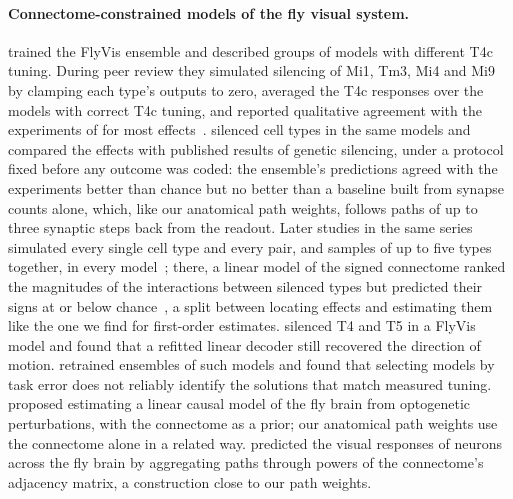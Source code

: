 \paragraph{Connectome-constrained models of the fly visual system.}
\citet{lappalainen2024connectome} trained the FlyVis ensemble and described groups of models with different T4c tuning. During peer review they simulated silencing of Mi1, Tm3, Mi4 and Mi9 by clamping each type's outputs to zero, averaged the T4c responses over the models with correct T4c tuning, and reported qualitative agreement with the experiments of \citet{strother2017emergence} for most effects~\citep{lappalainen2024review}. \citet{ryan2026silencing} silenced cell types in the same \NModels{} models and compared the effects with published results of genetic silencing, under a protocol fixed before any outcome was coded: the ensemble's predictions agreed with the experiments better than chance but no better than a baseline built from synapse counts alone, which, like our anatomical path weights, follows paths of up to three synaptic steps back from the readout. Later studies in the same series simulated every single cell type and every pair, and samples of up to five types together, in every model~\citep{ryan2026tests,ryan2026budget}; there, a linear model of the signed connectome ranked the magnitudes of the interactions between silenced types but predicted their signs at or below chance~\citep{ryan2026budget}, a split between locating effects and estimating them like the one we find for first-order estimates. \citet{dhiman2026scale} silenced T4 and T5 in a FlyVis model and found that a refitted linear decoder still recovered the direction of motion. \citet{karaneen2026reproducibility} retrained ensembles of such models and found that selecting models by task error does not reliably identify the solutions that match measured tuning. \citet{pospisil2024effectome} proposed estimating a linear causal model of the fly brain from optogenetic perturbations, with the connectome as a prior; our anatomical path weights use the connectome alone in a related way. \citet{xie2025visual} predicted the visual responses of neurons across the fly brain by aggregating paths through powers of the connectome's adjacency matrix, a construction close to our path weights.

